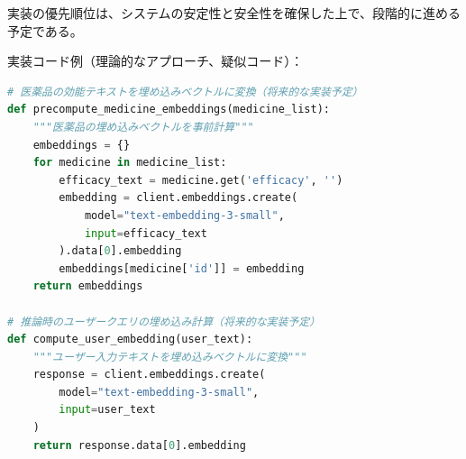 \documentclass[a4paper,11pt,ja=standard,xelatex]{bxjsarticle}
\theoremstyle{definition}
\begin{document}
実装の優先順位は、システムの安定性と安全性を確保した上で、段階的に進める予定である。

実装コード例（理論的なアプローチ、疑似コード）：

\begin{lstlisting}[language=Python, caption=埋め込みベクトルの計算と保存（理論的アプローチ）]
# 医薬品の効能テキストを埋め込みベクトルに変換（将来的な実装予定）
def precompute_medicine_embeddings(medicine_list):
    """医薬品の埋め込みベクトルを事前計算"""
    embeddings = {}
    for medicine in medicine_list:
        efficacy_text = medicine.get('efficacy', '')
        embedding = client.embeddings.create(
            model="text-embedding-3-small",
            input=efficacy_text
        ).data[0].embedding
        embeddings[medicine['id']] = embedding
    return embeddings

# 推論時のユーザークエリの埋め込み計算（将来的な実装予定）
def compute_user_embedding(user_text):
    """ユーザー入力テキストを埋め込みベクトルに変換"""
    response = client.embeddings.create(
        model="text-embedding-3-small",
        input=user_text
    )
    return response.data[0].embedding
\end{lstlisting}
\end{document}
